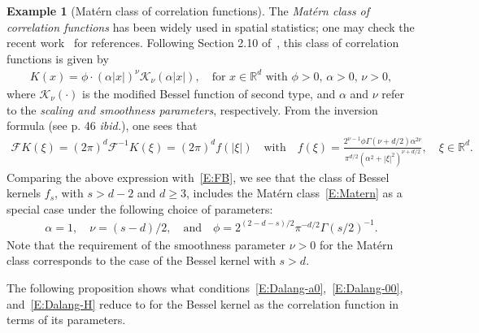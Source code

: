 \documentclass[a4paper,11pt]{article}%
\theoremstyle{plain}
\theoremstyle{definition}
\newtheorem{example}[theorem]{Example}
\numberwithin{equation}{section}
\newcommand{\R}{\mathbb{R}}
\begin{document}
\begin{example}[Mat\'ern class of correlation functions]
  The \textit{Mat\'ern class of correlation functions} has been widely used in spatial statistics;
  one may check the recent work~\cite{loh.sun.ea:21:on} for references. Following Section 2.10
  of~\cite{stein:99:interpolation}, this class of correlation functions is given by
  \begin{align}\label{E:Matern}
    K(x) = \phi \cdot (\alpha |x|)^\nu \mathcal{K}_\nu\left(\alpha |x|\right), \quad \text{for
    $x\in\R^d$ with $\phi>0$, $\alpha>0$, $\nu >0$},
  \end{align}
  where $\mathcal{K}_\nu(\cdot)$ is the modified Bessel function of second type, and $\alpha$ and
  $\nu$ refer to the \textit{scaling and smoothness parameters}, respectively. From the inversion
  formula (see p. 46 \textit{ibid.}), one sees that
  \begin{align*}
    \mathcal{F}K(\xi) = (2\pi)^{d} \mathcal{F}^{-1} K(\xi) = (2\pi)^d f(|\xi|)
    \quad \text{with} \quad
    f(\xi) = \frac{2^{\nu-1} \phi \Gamma\left(\nu +d/2\right)\alpha^{2\nu}}{\pi^{d/2}\left(\alpha^2+|\xi|^2\right)^{\nu+d/2}}, \quad \xi\in\R^d.
  \end{align*}
  Comparing the above expression with~\eqref{E:FB}, we see that the class of Bessel kernels $f_s$,
  with $s>d-2$ and $d\ge 3$, includes the Mat\'ern class~\eqref{E:Matern} as a special case under
  the following choice of parameters:
  \begin{align*}
    \alpha = 1,\quad \nu = (s-d)/2,\quad \text{and} \quad \phi = 2^{(2-d-s)/2} \pi^{-d/2} \Gamma(s /2)^{-1}.
  \end{align*}
  Note that the requirement of the smoothness parameter $\nu>0$ for the Mat\'ern class corresponds
  to the case of the Bessel kernel with $s>d$.
\end{example}


The following proposition shows what conditions~\eqref{E:Dalang-a0},~\eqref{E:Dalang-00},
and~\eqref{E:Dalang-H} reduce to for the Bessel kernel as the correlation function in terms of its
parameters.
\end{document}

